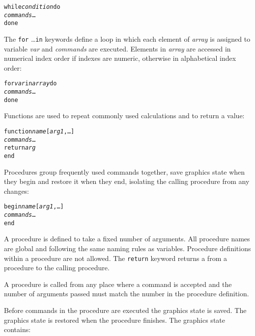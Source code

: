 \begin{alltt}
while \textit{condition} do
  \textit{commands} \dots
done
\end{alltt}

The \texttt{for} \dots \texttt{in} keywords define a loop in which
each element of \textit{array} is assigned to variable \textit{var}
and \textit{commands} are executed.
Elements in \textit{array} are accessed in numerical index order if
indexes are numeric, otherwise in alphabetical index order:

\begin{alltt}
for \textit{var} in \textit{array} do
  \textit{commands} \dots
done
\end{alltt}

Functions are used to repeat commonly used calculations and to
return a value:

\begin{alltt}
function \textit{name} [\textit{arg1}, \dots]
  \textit{commands} \dots
  \texttt{return} \textit{arg}
end
\end{alltt}

Procedures group frequently used commands together, save
graphics state when they begin and restore it when they end,
isolating the calling procedure from any changes:

\begin{alltt}
begin \textit{name} [\textit{arg1}, \dots]
  \textit{commands} \dots
end
\end{alltt}

A procedure is defined to take a fixed number of arguments.
All procedure names are global and following the same naming
rules as variables.
Procedure definitions within a procedure are not allowed.
The \texttt{return} keyword returns a
from a procedure to the calling procedure.

A procedure is called from any place where a command is accepted
and the number of arguments passed must match the number 
in the procedure definition.

Before commands in the procedure are executed
the graphics state is saved.
\label{graphicsstate}
The graphics state is restored when the procedure finishes.
The graphics state contains:

